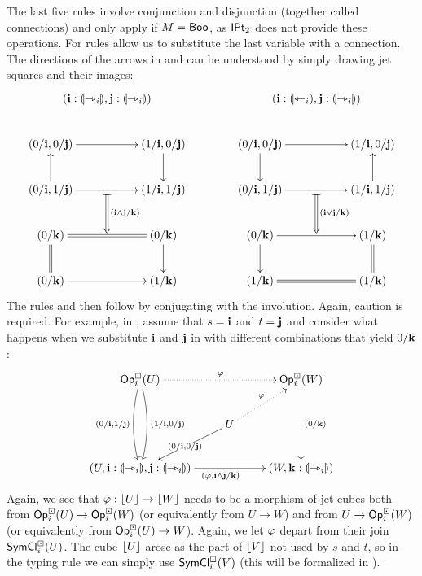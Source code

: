 \documentclass[a4paper]{article}
\begin{document}
The last five rules involve conjunction and disjunction (together called connections) and only apply if $M = \mathsf{Boo}$, as ${\mathsf{IPt}_2}$ does not provide these operations.
For rules allow us to substitute the last variable with a connection.
The directions of the arrows in  and  can be understood by simply drawing jet squares and their images:
\[
	\xymatrix{
		& {\mathclap{(\dm i : \rival{\jet_i}, \dm j : \rival{\jet_i})}}
		\\
		(0/\dm i, 0/\dm j)
			\ar[rr]
			\ar@{<-}[d]
		&&
		(1/\dm i, 0/\dm j)
			\ar[d]
		\\
		(0/\dm i, 1/\dm j)
			\ar[rr]
		& \ar@{|=>}[d]^{(\dm i \wedge \dm j / \dm k)} &
		(1/\dm i, 1/\dm j)
		\\
		(0/\dm k)
			\ar@{=}[rr]
			\ar@{=}[d]
		&&
		(0/\dm k)
			\ar[d]
		\\
		(0/\dm k)
			\ar[rr]
		&&
		(1/\dm k)
	}
	\qquad \qquad
	\xymatrix{
		& {\mathclap{(\dm i : \rival{\tej_i}, \dm j : \rival{\jet_i})}}
		\\
		(0/\dm i, 0/\dm j)
			\ar[rr]
			\ar[d]
		&&
		(1/\dm i, 0/\dm j)
			\ar@{<-}[d]
		\\
		(0/\dm i, 1/\dm j)
			\ar[rr]
		& \ar@{|=>}[d]^{(\dm i \vee \dm j / \dm k)} &
		(1/\dm i, 1/\dm j)
		\\
		(0/\dm k)
			\ar[rr]
			\ar[d]
		&&
		(1/\dm k)
			\ar@{=}[d]
		\\
		(1/\dm k)
			\ar@{=}[rr]
		&&
		(1/\dm k)
	}
\]
The rules  and  then follow by conjugating with the involution.
Again, caution is required.
For example, in , assume that $s = \mathbf{i}$ and $t = \mathbf{j}$ and consider what happens when we substitute $\mathbf{i}$ and $\mathbf{j}$ in  with different combinations that yield $0/\mathbf{k}$:
\[
	\xymatrix{
		\Opcube_i(U)
			\ar@/_/[dd]_{(0/\dm i, 1/\dm j)}
			\ar@/^/[dd]^{(1/\dm i, 0/\dm j)}
			\ar@{.>}[rr]^\vfi
		&& \Opcube_i(W)
			\ar[dd]^{(0/\dm k)}
		\\
		& U
			\ar[ld]|{(0/\dm i, 0/\dm j)}
			\ar@{.>}[ru]^\vfi
		\\
		(U, \dm i : \rival{\jet_i}, \dm j : \rival{\jet_i})
		\ar[rr]_{(\vfi, \dm i \wedge \dm j / \dm k)}
		&&
		(W, \dm k : \rival{\jet_i})
	}
\]
Again, we see that $\varphi : \mathopen{}\left\lfloor U \right\rfloor\mathclose{} \to \mathopen{}\left\lfloor W \right\rfloor\mathclose{}$ needs to be a morphism of jet cubes both from ${\mathsf{Op}}^\boxdot_i(U) \to {\mathsf{Op}}^\boxdot_i(W)$ (or equivalently from $U \to W$) and from $U \to {\mathsf{Op}}^\boxdot_i(W)$ (or equivalently from ${\mathsf{Op}}^\boxdot_i(U) \to W$). Again, we let $\varphi$ depart from their join $\mathsf{SymCl}^\boxdot_i(U)$.
The cube $\mathopen{}\left\lfloor U \right\rfloor\mathclose{}$ arose as the part of $\mathopen{}\left\lfloor V \right\rfloor\mathclose{}$ not used by $s$ and $t$, so in the typing rule we can simply use $\mathsf{SymCl}^\boxdot_i(V)$ (this will be formalized in ).
\end{document}
